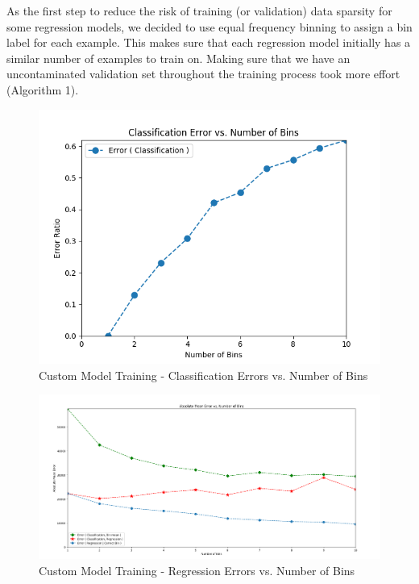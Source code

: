 \documentclass[conference,compsoc]{IEEEtran}
\begin{document}
\par
As the first step to reduce the risk of training (or validation) data sparsity for some regression models, we decided to use equal frequency binning to assign a bin label for each example. This makes sure that each regression model initially has a similar number of examples to train on. Making sure that we have an uncontaminated validation set throughout the training process took more effort (Algorithm 1).

\begin{figure}[!h]
  \includegraphics[width=\linewidth,natwidth=640,natheight=476]{DT_Linear_binerror.png}
  \caption{Custom Model Training - Classification Errors vs. Number of Bins}
  \label{fig:classificatinerror}
\end{figure}

\begin{figure}[!htbp]
  \includegraphics[width=\linewidth,natwidth=1765,natheight=851]{Decisiontree_linear_lines.png}
  \caption{Custom Model Training - Regression Errors vs. Number of Bins}
  \label{fig:regressionerror}
\end{figure}
\end{document}
